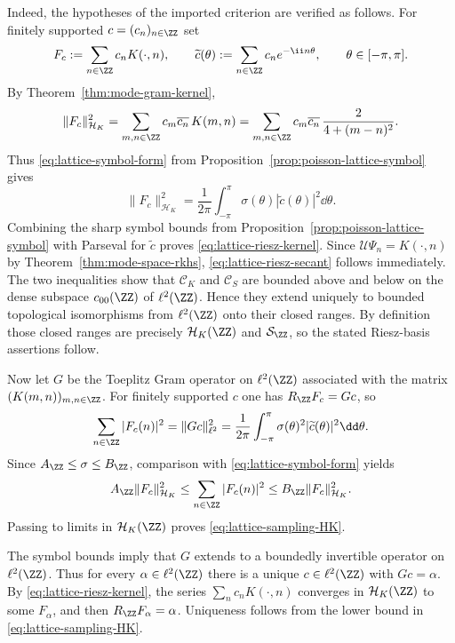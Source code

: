 Indeed, the hypotheses of the imported criterion are verified as follows.
For finitely supported $c=(c_n)_{n\in\ZZ}$ set
\[
F_c:=\sum_{n\in\ZZ}c_nK(\cdot,n),
\qquad
\widetilde c(\theta):=\sum_{n\in\ZZ}c_ne^{-\ii n\theta},
\qquad
\theta\in[-\pi,\pi].
\]
By Theorem~\ref{thm:mode-gram-kernel},
\[
\|F_c\|_{\mathcal H_K}^2
=\sum_{m,n\in\ZZ}c_m\overline{c_n}\,K(m,n)
=\sum_{m,n\in\ZZ}c_m\overline{c_n}\,\frac{2}{4+(m-n)^2}.
\]
Thus \eqref{eq:lattice-symbol-form} from
Proposition~\ref{prop:poisson-lattice-symbol} gives
\[
\|F_c\|_{\mathcal H_K}^2
=\frac{1}{2\pi}\int_{-\pi}^{\pi}\sigma(\theta)
|\widetilde c(\theta)|^2\dd\theta.
\]
Combining the sharp symbol bounds from
Proposition~\ref{prop:poisson-lattice-symbol} with Parseval for
$\widetilde c$ proves \eqref{eq:lattice-riesz-kernel}.  Since
$\mathcal U\Psi_n=K(\cdot,n)$ by
Theorem~\ref{thm:mode-space-rkhs}, \eqref{eq:lattice-riesz-secant}
follows immediately.
The two inequalities show that $\mathcal C_K$ and $\mathcal C_S$
are bounded above and below on the dense subspace $c_{00}(\ZZ)$ of
$\ell^2(\ZZ)$.  Hence they extend uniquely to bounded topological
isomorphisms from $\ell^2(\ZZ)$ onto their closed ranges.  By definition
those closed ranges are precisely $\mathcal H_K(\ZZ)$ and
$\mathcal S_{\ZZ}$, so the stated Riesz-basis assertions follow.

Now let $G$ be the Toeplitz Gram operator on $\ell^2(\ZZ)$ associated
with the matrix $(K(m,n))_{m,n\in\ZZ}$.  For finitely supported $c$ one
has $R_{\ZZ}F_c=Gc$, so
\[
\sum_{n\in\ZZ}|F_c(n)|^2
=\|Gc\|_{\ell^2}^2
=\frac{1}{2\pi}\int_{-\pi}^{\pi}\sigma(\theta)^2
|\widetilde c(\theta)|^2\dd\theta.
\]
Since $A_{\ZZ}\le \sigma\le B_{\ZZ}$, comparison with
\eqref{eq:lattice-symbol-form} yields
\[
A_{\ZZ}\|F_c\|_{\mathcal H_K}^2
\le
\sum_{n\in\ZZ}|F_c(n)|^2
\le
B_{\ZZ}\|F_c\|_{\mathcal H_K}^2.
\]
Passing to limits in $\mathcal H_K(\ZZ)$ proves
\eqref{eq:lattice-sampling-HK}.

The symbol bounds imply that $G$ extends to a boundedly invertible
operator on $\ell^2(\ZZ)$.  Thus for every $\alpha\in\ell^2(\ZZ)$ there is
a unique $c\in\ell^2(\ZZ)$ with $Gc=\alpha$.  By
\eqref{eq:lattice-riesz-kernel}, the series $\sum_n c_nK(\cdot,n)$
converges in $\mathcal H_K(\ZZ)$ to some $F_\alpha$, and then
$R_{\ZZ}F_\alpha=\alpha$.  Uniqueness follows from the lower bound in
\eqref{eq:lattice-sampling-HK}.
\fi

